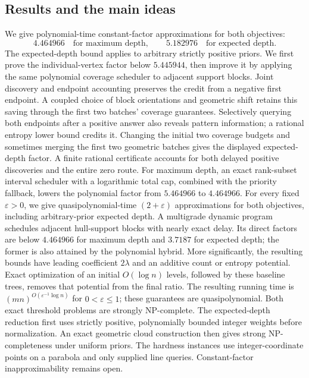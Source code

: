 \subsection{Results and the main ideas}

We give polynomial-time constant-factor approximations for both
objectives:
\[
 4.464966
 \quad\text{for maximum depth},\qquad
 5.182976
 \quad\text{for expected depth}.
\]
The expected-depth bound applies to arbitrary strictly positive priors.
We first prove the individual-vertex factor below $5.445944$, then
improve it by applying the same polynomial coverage scheduler to
adjacent support blocks. Joint discovery and endpoint accounting
preserves the credit from a negative first endpoint. A coupled choice
of block orientations and geometric shift retains this saving through
the first two batches' coverage guarantees. Selectively querying both
endpoints after a positive answer also reveals pattern information;
a rational entropy lower bound credits it. Changing the initial
two coverage budgets and sometimes merging the first two geometric batches
gives the displayed expected-depth factor. A finite rational certificate
accounts for both delayed positive discoveries and the entire zero route.
For maximum depth, an exact rank-subset interval
scheduler with a logarithmic total cap, combined with the priority
fallback, lowers the polynomial factor from $5.464966$ to $4.464966$.
For every fixed $\varepsilon>0$, we give quasipolynomial-time
$(2+\varepsilon)$ approximations for both objectives, including
arbitrary-prior expected depth. A multigrade dynamic program schedules
adjacent hull-support blocks with nearly exact delay. Its direct
factors are below $4.464966$ for maximum depth and $3.7187$ for
expected depth; the former is also attained by the polynomial hybrid.
More significantly, the resulting bounds have leading
coefficient $2\lambda$ and an additive count or entropy potential.
Exact optimization of an initial $O(\log n)$ levels, followed by
these baseline trees, removes that potential from the final ratio.
The resulting running time is
$(mn)^{O(\varepsilon^{-1}\log n)}$ for $0<\varepsilon\le1$;
these guarantees are quasipolynomial.
Both exact threshold problems are strongly NP-complete. The
expected-depth reduction first uses strictly positive, polynomially
bounded integer weights before normalization. An exact geometric cloud
construction then gives strong NP-completeness under uniform priors.
The hardness instances
use integer-coordinate points on a parabola and only supplied line
queries. Constant-factor inapproximability remains open.

